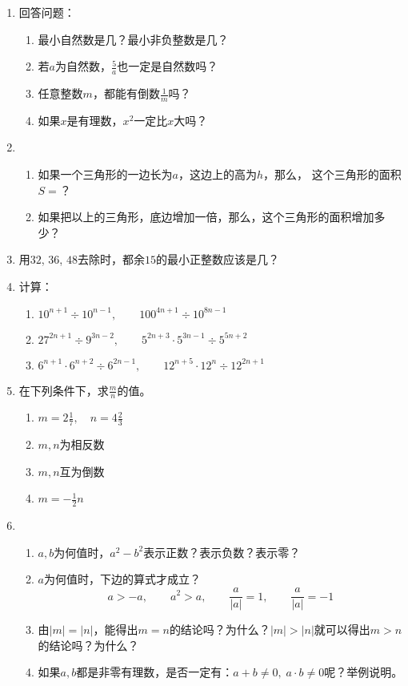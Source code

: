 \begin{enumerate}
    \item 回答问题：
\begin{enumerate}
    \item 最小自然数是几？最小非负整数是几？
    \item 若$a$为自然数，$\frac{5}{a}$也一定是自然数吗？
    \item 任意整数$m$，都能有倒数$\frac{1}{m}$吗？
    \item 如果$x$是有理数，$x^2$一定比$x$大吗？
\end{enumerate}
   
\item \begin{enumerate}
    \item 如果一个三角形的一边长为$a$，这边上的高为$h$，那么，
这个三角形的面积$S=$？
\item 如果把以上的三角形，底边增加一倍，那么，这个三角形的面积增加多少？
\end{enumerate}

\item 用$32$, $36$, $48$去除时，都余$15$的最小正整数应该是几？

\item 计算：
\begin{enumerate}
    \item $10^{n+1}\div 10^{n-1}  ,\qquad 100^{4n+1}\div 10^{8n-1} $
    \item $27^{2n+1}\div 9^{3n-2}  ,\qquad 5^{2n+3}\cdot 5^{3n-1}\div 5^{5n+2} $
    \item $6^{n+1}\cdot 6^{n+2} \div 6^{2n-1},\qquad 12^{n+5}\cdot 12^n\div 12^{2n+1} $
\end{enumerate}

\item 在下列条件下，求$\frac{m}{n}$的值。
\begin{multicols}{2}
    \begin{enumerate}
        \item $m=2\frac{1}{7},\quad n=4\frac{2}{3}$
        \item $m,n$为相反数
        \item $m,n$互为倒数
        \item $m=-\frac{1}{2}n$
    \end{enumerate}
\end{multicols}

\item  \begin{enumerate}
    \item $a,b$为何值时，$a^2-b^2$表示正数？表示负数？表示零？
    \item $a$为何值时，下边的算式才成立？
    \[a>-a,\qquad a^2>a,\qquad \frac{a}{|a|}=1,\qquad \frac{a}{|a|}=-1\]
    \item 由$|m|=|n|$，能得出$m=n$的结论吗？为什么？$|m|>|n|$就可以得出$m>n$的结论吗？为什么？
    \item 如果$a,b$都是非零有理数，是否一定有：$a+b\ne 0,\; a\cdot b\ne 0$呢？举例说明。
\end{enumerate}


\end{enumerate}
